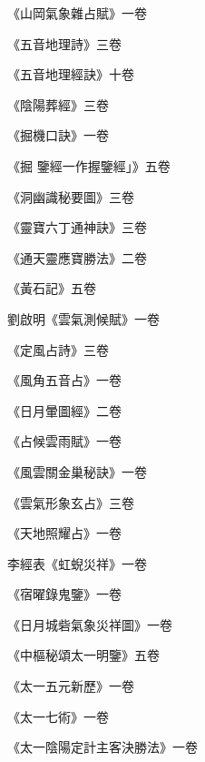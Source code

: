 \begin{pinyinscope}
 《山岡氣象雜占賦》一卷



 《五音地理詩》三卷



 《五音地理經訣》十卷



 《陰陽葬經》三卷



 《掘機口訣》一卷



 《掘
 鑒經一作握鑒經」》五卷



 《洞幽識秘要圖》三卷



 《靈寶六丁通神訣》三卷



 《通天靈應寶勝法》二卷



 《黃石記》五卷



 劉啟明《雲氣測候賦》一卷



 《定風占詩》三卷



 《風角五音占》一卷



 《日月暈圖經》二卷



 《占候雲雨賦》一卷



 《風雲關金巢秘訣》一卷



 《雲氣形象玄占》三卷



 《天地照耀占》一卷



 李經表《虹蜺災祥》一卷



 《宿曜錄鬼鑒》一卷



 《日月城砦氣象災祥圖》一卷



 《中樞秘頌太一明鑒》五卷



 《太一五元新歷》一卷



 《太一七術》一卷



 《太一陰陽定計主客決勝法》一卷




\end{pinyinscope}
